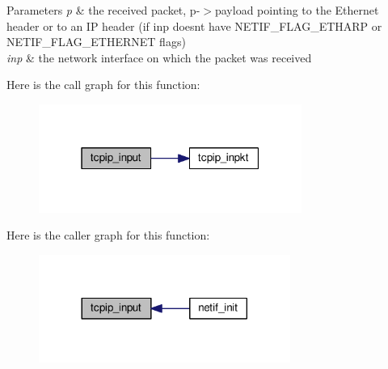\begin{DoxyParams}{Parameters}
{\em p} & the received packet, p-\/$>$payload pointing to the Ethernet header or to an IP header (if inp doesn\textquotesingle{}t have N\+E\+T\+I\+F\+\_\+\+F\+L\+A\+G\+\_\+\+E\+T\+H\+A\+RP or N\+E\+T\+I\+F\+\_\+\+F\+L\+A\+G\+\_\+\+E\+T\+H\+E\+R\+N\+ET flags) \\
\hline
{\em inp} & the network interface on which the packet was received \\
\hline
\end{DoxyParams}
Here is the call graph for this function\+:
\nopagebreak
\begin{figure}[H]
\begin{center}
\leavevmode
\includegraphics[width=244pt]{group__lwip__os_gae510f195171bed8499ae94e264a92717_cgraph}
\end{center}
\end{figure}
Here is the caller graph for this function\+:
\nopagebreak
\begin{figure}[H]
\begin{center}
\leavevmode
\includegraphics[width=233pt]{group__lwip__os_gae510f195171bed8499ae94e264a92717_icgraph}
\end{center}
\end{figure}
